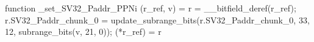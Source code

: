 function _set_SV32_Paddr_PPNi (r_ref, v) = {
    r = __bitfield_deref(r_ref);
    r.SV32_Paddr_chunk_0 = update_subrange_bits(r.SV32_Paddr_chunk_0, 33, 12, subrange_bits(v, 21, 0));
    (*r_ref) = r
}
